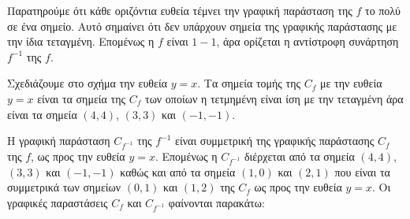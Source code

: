 \begin{alist}
    \item [α)] Παρατηρούμε ότι κάθε οριζόντια ευθεία τέμνει την γραφική παράσταση της $f$ το πολύ σε ένα σημείο. Αυτό σημαίνει ότι δεν υπάρχουν σημεία της γραφικής παράστασης με την ίδια τεταγμένη. Επομένως η $f$ είναι $1-1$, άρα ορίζεται η αντίστροφη συνάρτηση $f^{-1}$ της $f$.

    \item [β)] Σχεδιάζουμε στο σχήμα την ευθεία $y = x$. Τα σημεία τομής της $C_f$ με την ευθεία $y = x$ είναι τα σημεία της $C_f$ των οποίων η τετμημένη είναι ίση με την τεταγμένη άρα είναι τα σημεία $(4,4)$, $(3,3)$ και $(-1,-1)$.

    \item [γ)] Η γραφική παράσταση $C_{f^{-1}}$ της $f^{-1}$ είναι συμμετρική της γραφικής παράστασης $C_f$ της $f$, ως προς την ευθεία $y = x$. Επομένως η $C_{f^{-1}}$ διέρχεται από τα σημεία $(4,4)$, $(3,3)$ και $(-1,-1)$ καθώς και από τα σημεία $(1,0)$ και $(2,1)$ που είναι τα συμμετρικά των σημείων $(0,1)$ και $(1,2)$ της $C_f$ ως προς την ευθεία $y = x$. Οι γραφικές παραστάσεις $C_f$ και $C_{f^{-1}}$ φαίνονται παρακάτω:
\end{alist}